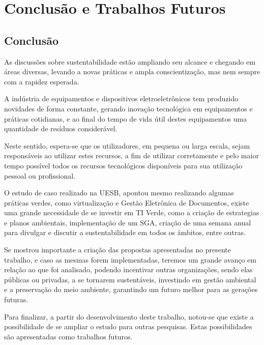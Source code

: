 
\chapter{Conclusão e Trabalhos Futuros }\label{chap:conclusão}

\section{Conclusão}

As discussões sobre sustentabilidade estão ampliando seu alcance e chegando em áreas diversas, levando a novas práticas e ampla conscientização, mas nem sempre com a rapidez esperada.

A indústria de equipamentos e dispositivos eletroeletrônicos tem produzido novidades de forma constante, gerando inovação tecnológica em equipamentos e práticas  cotidianas, e ao final do tempo de vida útil destes equipamentos uma quantidade de resíduos considerável.

Neste sentido, espera-se que os utilizadores, em pequena ou larga escala, sejam responsáveis ao utilizar estes recursos, a fim de utilizar corretamente e pelo maior tempo possível todos os recursos tecnológicos disponíveis para sua utilização pessoal ou profissional.

O estudo de caso realizado na UESB, apontou mesmo realizando algumas práticas verdes, como virtualização e Gestão Eletrônica de Documentos, existe uma grande necessidade de se investir em TI Verde, como a criação de estrategias e planos ambientais, implementação de um SGA, criação de uma semana anual para divulgar e discutir a sustentabilidade em todos os âmbitos, entre outras.

Se mostrou importante a criação das propostas apresentadas no presente trabalho, e caso as mesmas forem implementadas, teremos um grande avanço em relação ao que foi analisado, podendo incentivar outras organizações, sendo elas públicas ou privadas, a se tornarem sustentáveis, investindo em gestão ambiental e a preservação do meio ambiente, garantindo um futuro melhor para as gerações futuras.

Para finalizar, a partir do desenvolvimento deste trabalho, notou-se que existe a possibilidade de se ampliar o estudo para outras pesquisas. Estas possibilidades são apresentadas como trabalhos futuros.



